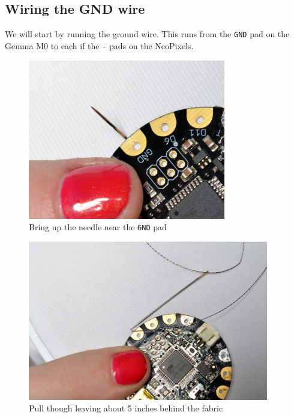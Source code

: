 \documentclass[letterpaper,twoside,12pt]{article}
\begin{document}
\subsection{Wiring the GND wire}
We will start by running the ground wire.  This runs from the \texttt{GND} pad 
on the Gemma M0 to each if the \texttt{-} pads on the NeoPixels.
\begin{figure}[hbpt]\begin{centering}%
\includegraphics[height=2.75in]{flora_DSC_0099.jpg}
\caption{Bring up the needle near the \texttt{GND} pad}
\label{fig:flora_DSC_0099}
\end{centering}\end{figure}
\begin{figure}[hbpt]\begin{centering}%
\includegraphics[height=2.75in]{flora_DSC_0100.jpg}
\caption{Pull though leaving about 5 inches behind the fabric}
\label{fig:flora_DSC_0100}
\end{centering}\end{figure}
\end{document}
